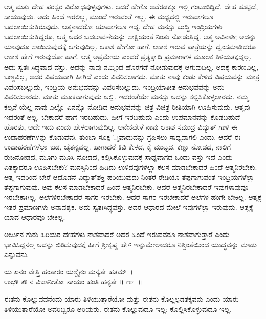 ಆತ್ಮ ಮತ್ತು ದೇಹ ಪರಸ್ಪರ ವಿರೋಧವುಳ್ಳವುಗಳು. ಆದರೆ ಹೇಗೊ ಅವೆರಡಕ್ಕೂ ಇಲ್ಲಿ ಗಂಟುಬಿದ್ದಿದೆ. ದೇಹ ಹುಟ್ಟಿದೆ, ಸಾಯುವುದು. ಅದು ಹಿಂದೆ ಇರಲಿಲ್ಲ, ಮುಂದೆ ಇರುವಂತೆ ಇಲ್ಲ. ಈ ಮಧ್ಯದಲ್ಲಿ ಇರುವಾಗಲೂ ಬದಲಾಯಿಸುತ್ತಿರುವುದು. ಆತ್ಮನಾದರೋ ಯಾವಾಗಲೂ ಇದ್ದ. ದೇಹ ಮನಸ್ಸು ಬುದ್ಧಿ ಇಂದ್ರಿಯಗಳು ಬದಲಾಯಿಸುತ್ತಿದ್ದರೂ, ಆತ್ಮ ಅದರ ಬದಲಾವಣೆಯನ್ನು ಸಾಕ್ಷಿಯಂತೆ ನಿಂತು ನೋಡುತ್ತಿದ್ದ. ಆತ್ಮ ಅವಿನಾಶಿ; ಅದನ್ನು ಯಾವುದೂ ಸಾಯಿಸುವುದಕ್ಕೆ ಆಗುವುದಿಲ್ಲ. ಆಕಾಶ ಹೇಗೋ ಹಾಗೆ. ಆಕಾಶ ಇರುವ ಪಾತ್ರೆಯನ್ನು ಧ್ವಂಸಮಾಡಿದರೂ ಆಕಾಶ ಹೇಗೆ ಇರುವುದೋ ಹಾಗೆ. ಆತ್ಮ ಅಪ್ರಮೇಯ ಎಂದರೆ ಪ್ರತ್ಯಕ್ಷಾದಿ ಪ್ರಮಾಣಗಳ ಮೂಲಕ ತಿಳಿಯತಕ್ಕದ್ದಲ್ಲ. ಅದು ಸ್ವತಃ ಸಿದ್ಧವಾದ ವಸ್ತು. ಅದನ್ನು ನಾವು ನಮ್ಮಿಂದ ಹೊರಗಡೆ ನೋಡುವುದಕ್ಕೆ ಆಗುವುದಿಲ್ಲ. ಅದಕ್ಕೆ ಕಾರಣವಿಲ್ಲ, ಬಣ್ಣವಿಲ್ಲ, ಅದರ ವಿಷಯವಾಗಿ ಹೀಗಿದೆ ಎಂದು ವಿವರಿಸಲಾಗದು. ಮಾತು ನಾವು ಕಂಡು ಕೇಳಿದ ವಿಷಯವನ್ನು ಮಾತ್ರ ವಿವರಿಸಬಲ್ಲುದು, ಇಂದ್ರಿಯ ಅನುಭವವನ್ನು ವಿವರಿಸಬಲ್ಲುದು. ಇಂದ್ರಿಯಾತೀತ ಅನುಭವವನ್ನು ಅದು ವಿವರಿಸಲಾರದು. ಮಾತು ಮೂಕವಾಗುವುದು ಅಲ್ಲಿ. ಇದರಂತೆಯೇ ಮನಸ್ಸು ಅದನ್ನು ಕಲ್ಪಿಸಿಕೊಳ್ಳಲಾರದು. ನಮ್ಮ ಕಲ್ಪನೆ ಯೆಲ್ಲ ನಾವು ಎಲ್ಲೊ ಏನನ್ನೊ ನೋಡಿದ ಅನುಭವವನ್ನು ಚಿತ್ರ ವಿಚಿತ್ರ ರೀತಿಯಾಗಿ ಊಹಿಸುವುದು. ಆತ್ಮವು ಇದರಂತೆ ಅಲ್ಲ. ಬೇಕಾದರೆ ಹಾಗೆ ಇರಬಹುದು, ಹೀಗೆ ಇರಬಹುದು ಎಂದು ಉಪಮಾನವನ್ನು ಕೊಡಬಹುದೆ ಹೊರತು, ಅದೇ ಇದು ಎಂದು ಹೇಳಲಾಗುವುದಿಲ್ಲ. ಅನೇಕವೇಳೆ ನಾವು ಆಕಾಶ ಸಮುದ್ರ ವಿದ್ಯುತ್ ಗಾಳಿ ಈ ಉದಾಹರಣೆಗಳನ್ನು ಕೊಡುವೆವು, ತುಂಬಾ ಸೂಕ್ಷ ್ಮವಾದುದನ್ನು ಗ್ರಹಿಸಲು ಸಾಧ್ಯವಾಗಲಿ ಎಂದು. ಆದರೆ ಈ ಉದಾಹರಣೆಗಳೆಲ್ಲಾ ಜಡ, ಚೈತನ್ಯವಲ್ಲ. ಹಾಗಾದರೆ ಕಿವಿ ಕೇಳದ, ಕೈ ಮುಟ್ಟದ, ಕಣ್ಣು ನೋಡದ, ನಾಲಿಗೆ ರುಚಿನೋಡದ, ಮೂಗು ಮೂಸಿ ನೋಡದ, ಕಲ್ಪಿಸಿಕೊಳ್ಳುವುದಕ್ಕೆ ಸಾಧ್ಯವಾಗದ ಒಂದು ವಸ್ತು ಇದೆ ಎಂದು ಏತಕ್ಕಾದರೂ ಊಹಿಸಬೇಕು? ಮನಸ್ಸಿನಿಂದ ಹಿಡಿದು ಉಳಿದವುಗಳೆಲ್ಲಾ ಕೆಲಸ ಮಾಡಬೇಕಾದರೆ ಹಿಂದೆ ಆತ್ಮನಿರಬೇಕು. ಆತ್ಮ ಇದರಿಂದ ಬೇರೆ ಆದೊಡನೆ ವಿದ್ಯುತ್​ಶಕ್ತಿ ಹರಿಯುವುದು ನಿಂತರೆ ರೇಡಿಯೊ ತೆಪ್ಪಗಾಗುವಂತೆ ಇಂದ್ರಿಯಗಳೆಲ್ಲಾ ತೆಪ್ಪಗಾಗುವುವು. ಅವು ಕೆಲಸ ಮಾಡಬೇಕಾದರೆ ಹಿಂದೆ ಆತ್ಮನಿರಬೇಕು. ಆದರೆ ಆತ್ಮನಿರಬೇಕಾದರೆ ಇವುಗಳಾವುವೂ ಇರಬೇಕಾಗಿಲ್ಲ. ಅಲೆಗಳಿರಬೇಕಾದರೆ ಸಾಗರ ಇರಬೇಕು. ಆದರೆ ಸಾಗರ ಇರಬೇಕಾದರೆ ಅಲೆಗಳ ಹಂಗೇ ಬೇಕಿಲ್ಲ. ಆತ್ಮಕ್ಕೆ ಇತರ ಪ್ರಮಾಣಗಳು ಅನಾವಶ್ಯಕ. ಅದು ಸ್ವತಃಸಿದ್ಧವಸ್ತು. ಅದರ ಆಧಾರದ ಮೇಲೆ ಇವುಗಳೆಲ್ಲಾ ಇರುವುದು. ಆತ್ಮಕ್ಕೆ ಯಾವ ಆಧಾರವೂ ಬೇಕಿಲ್ಲ.

ಅರ್ಜುನ ಗುರು ಹಿರಿಯರ ದೇಹಗಳು ನಾಶವಾದರೆ ಅದರ ಹಿಂದೆ ಇರುವವರೂ ನಾಶವಾಗು\-ತ್ತಾರೆ ಎಂದು ಭಾವಿಸಿದ್ದನಲ್ಲ ಅದನ್ನು ಬಿಡಿಸುವುದಕ್ಕೆ ಹೀಗೆ ಶ‍್ರೀಕೃಷ್ಣ ಹೇಳಿ ಇನ್ನುಮೇಲಾದರೂ ನಿಶ್ಚಿಂತೆಯಿಂದ ಯುದ್ಧವನ್ನು ಮಾಡು ಎನ್ನುವನು.

\begin{shloka}
ಯ ಏನಂ ವೇತ್ತಿ ಹಂತಾರಂ ಯಶ್ಚೈನಂ ಮನ್ಯತೇ ಹತಮ್~।\\ಉಭೌ ತೌ ನ ವಿಜಾನೀತೋ ನಾಯಂ ಹಂತಿ ಹನ್ಯತೇ \hfill॥ ೧೯~॥
\end{shloka}

\begin{artha}
ಈತನು ಕೊಲ್ಲುವವನೆಂದು ಯಾರು ತಿಳಿಯುತ್ತಾರೆಯೋ ಮತ್ತು ಈತನು ಕೊಲ್ಲಲ್ಪಡತಕ್ಕವನು ಎಂದು ಯಾರು ತಿಳಿಯುತ್ತಾರೆಯೋ ಅವರಿಬ್ಬರೂ ಅರಿಯರು. 
 ಈತನು ಕೊಲ್ಲುವುದೂ ಇಲ್ಲ; ಕೊಲ್ಲಿಸಿಕೊಳ್ಳುವುದೂ ಇಲ್ಲ.
\end{artha}

